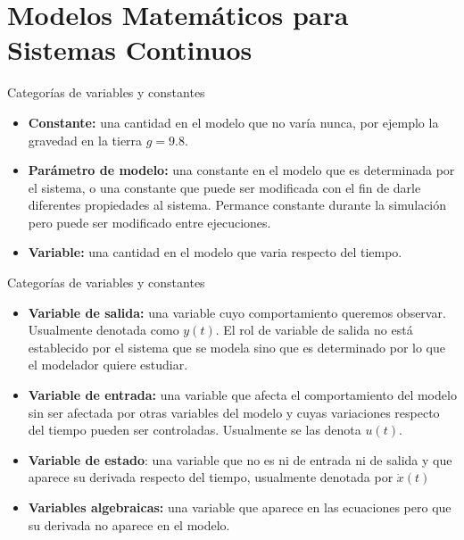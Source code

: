 \section{Modelos Matemáticos para Sistemas Continuos}

\begin{frame}{Categorías de variables y constantes}
    \begin{itemize}
        \item<1-> \textbf{Constante:} una cantidad en el modelo que no varía nunca, por ejemplo la gravedad en la tierra $g=9.8$.
        \item<2-> \textbf{Parámetro de modelo:} una constante en el modelo que es determinada por el sistema, o una constante que puede ser modificada con el fin de darle diferentes propiedades al sistema. Permance constante durante la simulación pero puede ser modificado entre ejecuciones.
        \item<3-> \textbf{Variable:} una cantidad en el modelo que varia respecto del tiempo.
    \end{itemize}
\end{frame}

\begin{frame}{Categorías de variables y constantes}
    \begin{itemize}
        \item<1-> \textbf{Variable de salida:} una variable cuyo comportamiento queremos observar. Usualmente denotada como $y(t)$. El rol de variable de salida no está establecido por el sistema que se modela sino que es determinado por lo que el modelador quiere estudiar.
        \item<2-> \textbf{Variable de entrada:} una variable que afecta el comportamiento del modelo sin ser afectada por otras variables del modelo y cuyas variaciones respecto del tiempo pueden ser controladas. Usualmente se las denota $u(t)$.
        \item<3-> \textbf{Variable de estado}: una variable que no es ni de entrada ni de salida y que aparece su derivada respecto del tiempo, usualmente denotada por $\dot{x}(t)$
        \item<4-> \textbf{Variables algebraicas:} una variable que aparece en las ecuaciones pero que su derivada no aparece en el modelo.
    \end{itemize}
\end{frame}

